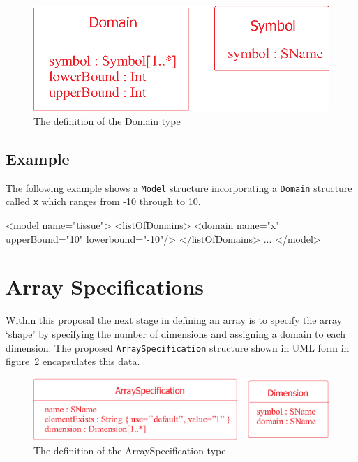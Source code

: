 \documentclass{cekarticle}
\begin{document}
\begin{figure}[h]
  \vspace*{8pt}
  \centering
  \includegraphics[scale = 0.7]{domain}
  \caption{The definition of the Domain type}
  \label{fig:domain}
\end{figure}

\subsection{Example}

The following example shows a \texttt{Model} structure
incorporating a \texttt{Domain} structure called \texttt{x} which
ranges from -10 through to 10.

\begin{example}
<model name="tissue">
    <listOfDomains>
        <domain name="x" upperBound="10" lowerbound="-10"/>
    </listOfDomains>
    ...
</model>
\end{example}

\section{Array Specifications}
\label{sec:arrayspec}

Within this proposal the next stage in defining an array is to
specify the array `shape' by specifying the number of dimensions
and assigning a domain to each dimension.  The proposed
\texttt{ArraySpecification} structure shown in UML form in
figure~\ref{fig:arrayspec} encapsulates this data.

\begin{figure}[h]
  \vspace*{8pt}
  \centering
  \includegraphics[scale = 0.7]{arrayspec}
  \caption{The definition of the ArraySpecification type}
  \label{fig:arrayspec}
\end{figure}
\end{document}
